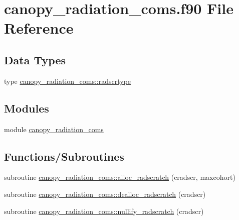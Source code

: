 \hypertarget{canopy__radiation__coms_8f90}{}\section{canopy\+\_\+radiation\+\_\+coms.\+f90 File Reference}
\label{canopy__radiation__coms_8f90}
\subsection*{Data Types}
\begin{DoxyCompactItemize}
\item 
type \hyperlink{structcanopy__radiation__coms_1_1radscrtype}{canopy\+\_\+radiation\+\_\+coms\+::radscrtype}
\end{DoxyCompactItemize}
\subsection*{Modules}
\begin{DoxyCompactItemize}
\item 
module \hyperlink{namespacecanopy__radiation__coms}{canopy\+\_\+radiation\+\_\+coms}
\end{DoxyCompactItemize}
\subsection*{Functions/\+Subroutines}
\begin{DoxyCompactItemize}
\item 
subroutine \hyperlink{namespacecanopy__radiation__coms_abf436863eec6f51fbcad29f1a0ad8833}{canopy\+\_\+radiation\+\_\+coms\+::alloc\+\_\+radscratch} (cradscr, maxcohort)
\item 
subroutine \hyperlink{namespacecanopy__radiation__coms_abbcda361926e277937b84aa18b779d72}{canopy\+\_\+radiation\+\_\+coms\+::dealloc\+\_\+radscratch} (cradscr)
\item 
subroutine \hyperlink{namespacecanopy__radiation__coms_a5d6cfa703bca9703874fe55efaf4f05d}{canopy\+\_\+radiation\+\_\+coms\+::nullify\+\_\+radscratch} (cradscr)
\end{DoxyCompactItemize}
